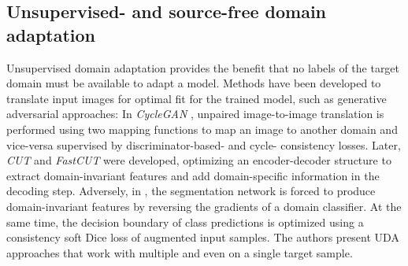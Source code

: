     \subsection{Unsupervised- and source-free domain adaptation} %
    Unsupervised domain adaptation provides the benefit that no labels of the target domain must be available to adapt a model. Methods have been developed to translate input images for optimal fit for the trained model, such as generative adversarial approaches: In \emph{CycleGAN}  \cite{zhu2017unpaired}, unpaired image-to-image translation is performed using two mapping functions to map an image to another domain and vice-versa supervised by discriminator-based- and cycle- consistency losses. Later, \emph{CUT} and \emph{FastCUT} \cite{park2020contrastive}  were developed, optimizing an encoder-decoder structure to extract domain-invariant features and add domain-specific information in the decoding step.  %
    Adversely, in \cite{varsavsky2020test}, %
    the segmentation network is forced to produce domain-invariant features by reversing the gradients of a domain classifier. At the same time, the decision boundary of class predictions is optimized using a consistency soft Dice loss of augmented input samples. The authors present UDA approaches that work with multiple and even on a single target sample. %

